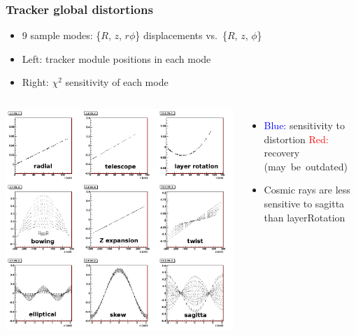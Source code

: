 \documentclass[compress]{beamer}
\begin{document}
\begin{frame}
\frametitle{Tracker global distortions}

\begin{itemize}
\item 9 sample modes: \{$R$, $z$, $r\phi$\} displacements vs.\ \{$R$, $z$, $\phi$\}
\item Left: tracker module positions in each mode
\item Right: $\chi^2$ sensitivity of each mode
\end{itemize}

\vspace{-0.5 cm}
\begin{columns}
\vspace{0.75 cm}
\includegraphics[width=\linewidth]{TrackerSystematics.png}
\begin{itemize}
\item \textcolor{blue}{Blue:} sensitivity to distortion \textcolor{red}{Red:} recovery \mbox{(may be outdated)\hspace{-1 cm}}
\item Cosmic rays are less sensitive to sagitta than layerRotation
\end{itemize}


\end{columns}
\end{frame}
\end{document}
